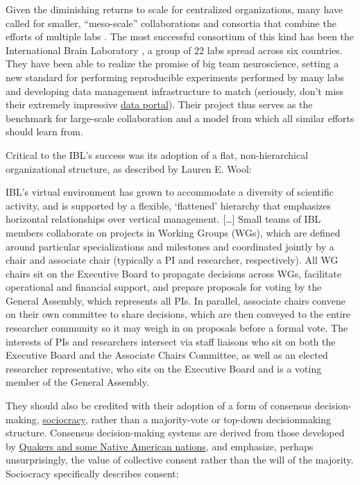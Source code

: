 \documentclass[11pt]{article}
\begin{document}
\begin{multicols}{2}
Given the diminishing returns to scale for centralized organizations,
many have called for smaller, ``meso-scale'' collaborations and
consortia that combine the efforts of multiple labs \cite{mainenBetterWayCrack2016} . The most successful consortium of this
kind has been the International Brain Laboratory \cite{abbottInternationalLaboratorySystems2017, woolKnowledgeNetworksHow2020} , a group of 22 labs spread across six countries. They have been
able to realize the promise of big team neuroscience, setting a new
standard for performing reproducible experiments performed by many labs
\cite{laboratoryStandardizedReproducibleMeasurement2020}  and
developing data management infrastructure to match \cite{laboratoryDataArchitectureLargescale2020}  (seriously, don't miss
their extremely impressive
\href{https://data.internationalbrainlab.org/}{data portal}). Their
project thus serves as the benchmark for large-scale collaboration and a
model from which all similar efforts should learn from.

Critical to the IBL's success was its adoption of a flat,
non-hierarchical organizational structure, as described by Lauren E.
Wool:

\begin{leftbar}
IBL's virtual environment has grown to accommodate a diversity of
scientific activity, and is supported by a flexible, `flattened'
hierarchy that emphasizes horizontal relationships over vertical
management. {[}\ldots{]} Small teams of IBL members collaborate on
projects in Working Groups (WGs), which are defined around particular
specializations and milestones and coordinated jointly by a chair and
associate chair (typically a PI and researcher, respectively). All WG
chairs sit on the Executive Board to propagate decisions across WGs,
facilitate operational and financial support, and prepare proposals for
voting by the General Assembly, which represents all PIs. In parallel,
associate chairs convene on their own committee to share decisions,
which are then conveyed to the entire researcher community so it may
weigh in on proposals before a formal vote. The interests of PIs and
researchers intersect via staff liaisons who sit on both the Executive
Board and the Associate Chairs Committee, as well as an elected
researcher representative, who sits on the Executive Board and is a
voting member of the General Assembly. \cite{woolKnowledgeNetworksHow2020} 
\end{leftbar}

They should also be credited with their adoption of a form of consensus
decision-making, \href{https://sociocracy.info}{sociocracy}, rather than
a majority-vote or top-down decisionmaking structure. Consensus
decision-making systems are derived from those developed by
\href{https://rhizomenetwork.wordpress.com/2011/06/18/a-brief-history-of-consenus-decision-making/}{Quakers
and some Native American nations}, and emphasize, perhaps
unsurprisingly, the value of collective consent rather than the will of
the majority. Sociocracy specifically describes consent:


\end{multicols}
\end{document}
